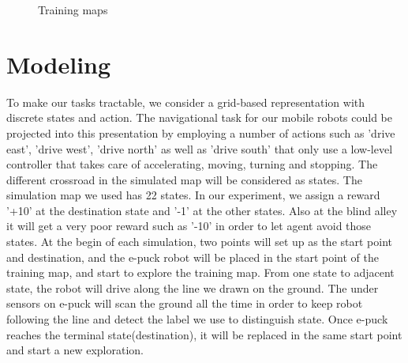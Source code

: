 \documentclass[a4paper, 11pt]{article} %
\begin{document}
\begin{figure}[tbp]
\centering
{}
\caption{Training maps}
\label{fig1}
\end{figure}


\section{Modeling}
To make our tasks tractable, we consider a grid-based representation with discrete
states and action. The navigational task for our mobile robots could be projected
into this presentation by employing a number of actions such as 'drive east',
'drive west', 'drive north' as well as 'drive south' that only use a low-level
controller that takes care of accelerating, moving, turning and stopping. The
different crossroad in the simulated map will be considered as states. The simulation
map we used has 22 states. In our experiment, we assign a reward '+10' at the destination
state and '-1' at the other states. Also at the blind alley it will get a very poor
reward such as '-10' in order to let agent avoid those states. At the begin of
each simulation, two points will set up as the start point and destination,
and the e-puck robot will be placed in the start point of the training map, and
start to explore the training map. From one state to adjacent state, the robot will
drive along the line we drawn on the ground. The under sensors on e-puck
will scan the ground all the time in order to keep robot following the line
and detect the label we use to distinguish state. Once e-puck reaches the terminal
state(destination), it will be replaced in the same start point and start a new exploration.
\end{document}
